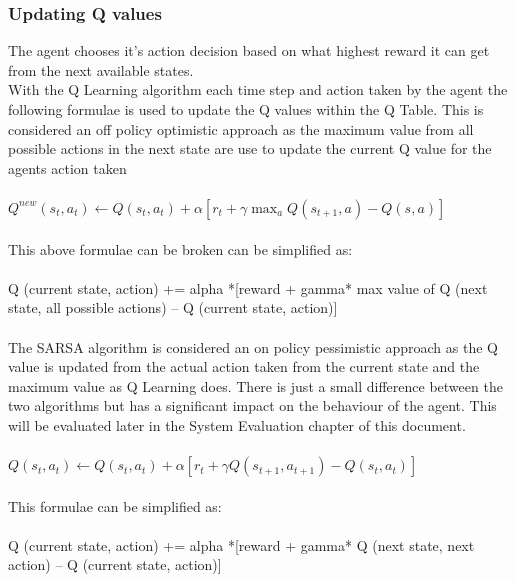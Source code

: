 \subsubsection{Updating Q values}
The agent chooses it's action decision based on what highest reward it can get from the next available states.\\

With the Q Learning algorithm each time step and action taken by the agent the following formulae is used to update the Q values within the Q Table. This is considered an off policy optimistic approach as the maximum value from all possible actions in the next state are use to update the current Q value for the agents action taken \\\\
$ Q^{new}(s_{t},a_{t})\leftarrow Q(s_{t},a_{t}) + \alpha[r_{t} + \gamma  \max _{a}Q(s_{t+1},a) - Q(s, a)]$~\cite{Qlearnin52:online}\\\\
This above formulae can be broken can be simplified as:\\\\
Q (current state, action) += alpha *[reward + gamma* max value of Q (next state, all possible actions) – Q (current state, action)]\\\\

The SARSA algorithm is considered an on policy pessimistic approach as the Q value is updated from the actual action taken from the current state and the maximum value as Q Learning does. There is just a small difference between the two algorithms but has a significant impact on the behaviour of the agent. This will be evaluated later in the System Evaluation chapter of this document.\\\\
$Q(s_{t},a_{t})\leftarrow Q(s_{t},a_{t})+\alpha [r_{t}+\gamma Q(s_{t+1},a_{t+1})-Q(s_{t},a_{t})]$~\cite{Stateac29:online}\\\\
This formulae can be simplified as:\\\\
Q (current state, action) += alpha *[reward + gamma*  Q (next state, next action) – Q (current state, action)]\\\\



